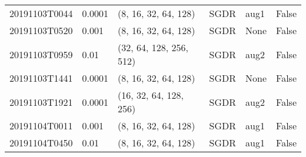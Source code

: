 \begin{table}[!ht]
\begin{tabular}{llllll}
			20191103T0044 &       0.0001 &     (8, 16, 32, 64, 128) &      SGDR &                  aug1 &                  False \\
			20191103T0520 &        0.001 &     (8, 16, 32, 64, 128) &      SGDR &                  None &                  False \\
			20191103T0959 &         0.01 &  (32, 64, 128, 256, 512) &      SGDR &                  aug2 &                  False \\
			20191103T1441 &       0.0001 &     (8, 16, 32, 64, 128) &      SGDR &                  None &                  False \\
			20191103T1921 &       0.0001 &   (16, 32, 64, 128, 256) &      SGDR &                  aug2 &                  False \\
			20191104T0011 &        0.001 &     (8, 16, 32, 64, 128) &      SGDR &                  aug1 &                  False \\
			20191104T0450 &         0.01 &     (8, 16, 32, 64, 128) &      SGDR &                  aug1 &                  False \\
			\bottomrule
		\end{tabular}
\end{table}
